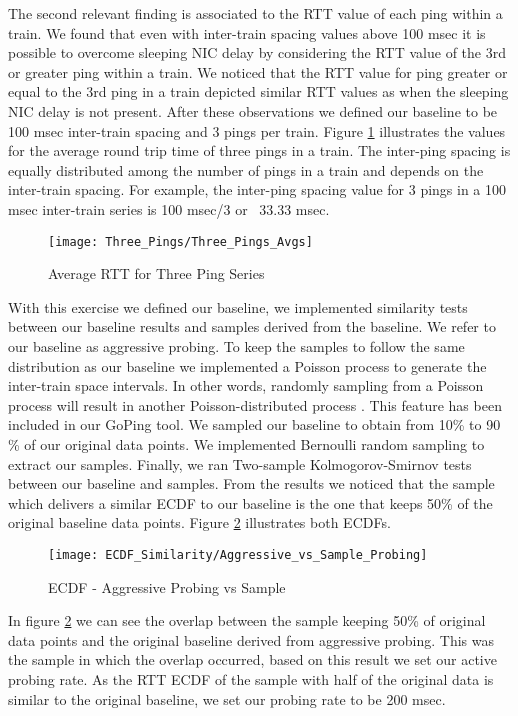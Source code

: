 The second relevant finding is associated to the RTT value of each ping within a train. We found that even with inter-train spacing values above 100 msec it is possible to overcome sleeping NIC delay by considering the RTT value of the 3rd or greater ping within a train. We noticed that the RTT value for ping greater or equal to the 3rd ping in a train depicted similar RTT values as when the sleeping NIC delay is not present. After these observations we defined our baseline to be 100 msec inter-train spacing and 3 pings per train. Figure \ref{image:Avg_RTT_Three_Pings} illustrates the values for the average round trip time of three pings in a train. The inter-ping spacing is equally distributed among the number of pings in a train and depends on the inter-train spacing. For example, the inter-ping spacing value for 3 pings in a 100 msec inter-train series is 100 msec/3 or ~33.33 msec.

\begin{figure}[h]
	\centering
	\texttt{[image: Three\_Pings/Three\_Pings\_Avgs]}
	\caption{Average RTT for Three Ping Series}
	\label{image:Avg_RTT_Three_Pings}
\end{figure}

With this exercise we defined our baseline, we implemented similarity tests between our baseline results and samples derived from the baseline. We refer to our baseline as aggressive probing. To keep the samples to follow the same distribution as our baseline we implemented a Poisson process to generate the inter-train space intervals. In other words, randomly sampling from a Poisson process will result in another Poisson-distributed process \cite{raikov_decomposition}. This feature has been included in our GoPing tool. We sampled our baseline to obtain from 10\% to 90 \% of our original data points. We implemented Bernoulli random sampling to extract our samples. Finally, we ran Two-sample Kolmogorov-Smirnov tests between our baseline and samples. From the results we noticed that the sample which delivers a similar ECDF to our baseline is the one that keeps 50\% of the original baseline data points. Figure \ref{image:ECDF_aggressive_vs_sampling} illustrates both ECDFs.

\begin{figure}[h]
	\centering
	\texttt{[image: ECDF\_Similarity/Aggressive\_vs\_Sample\_Probing]}
	\caption{ECDF - Aggressive Probing vs Sample}
	\label{image:ECDF_aggressive_vs_sampling}
\end{figure}

In figure \ref{image:ECDF_aggressive_vs_sampling} we can see the overlap between the sample keeping 50\% of original data points and the original baseline derived from aggressive probing. This was the sample in which the overlap occurred, based on this result we set our active probing rate. As the RTT ECDF of the sample with half of the original data is similar to the original baseline, we set our probing rate to be 200 msec.

